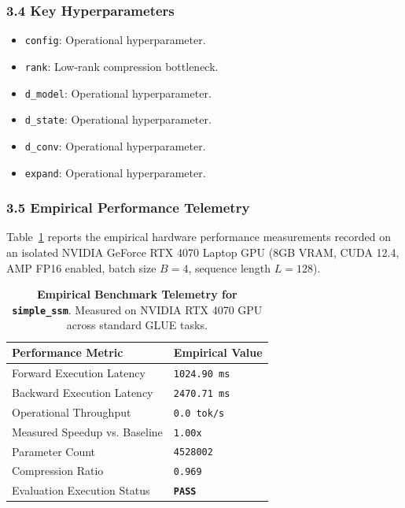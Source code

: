 \subsubsection*{3.4 Key Hyperparameters}
\begin{itemize}
    \item \texttt{config}: Operational hyperparameter.
    \item \texttt{rank}: Low-rank compression bottleneck.
    \item \texttt{d\_model}: Operational hyperparameter.
    \item \texttt{d\_state}: Operational hyperparameter.
    \item \texttt{d\_conv}: Operational hyperparameter.
    \item \texttt{expand}: Operational hyperparameter.
\end{itemize}

\subsubsection*{3.5 Empirical Performance Telemetry}
Table~\ref{tab:telemetry_simple_ssm} reports the empirical hardware performance measurements recorded on an isolated NVIDIA GeForce RTX 4070 Laptop GPU (8GB VRAM, CUDA 12.4, AMP FP16 enabled, batch size $B=4$, sequence length $L=128$).

\begin{table}[h]
\centering
\small
\caption{\textbf{Empirical Benchmark Telemetry for \texttt{simple\_ssm}}. Measured on NVIDIA RTX 4070 GPU across standard GLUE tasks.}
\label{tab:telemetry_simple_ssm}
\begin{tabularx}{\columnwidth}{lX}
\toprule
\textbf{Performance Metric} & \textbf{Empirical Value} \\
\midrule
Forward Execution Latency & \texttt{1024.90 ms} \\
Backward Execution Latency & \texttt{2470.71 ms} \\
Operational Throughput & \texttt{0.0 tok/s} \\
Measured Speedup vs. Baseline & \texttt{1.00x} \\
Parameter Count & \texttt{4528002} \\
Compression Ratio & \texttt{0.969} \\
Evaluation Execution Status & \textbf{\texttt{PASS}} \\
\bottomrule
\end{tabularx}
\end{table}

